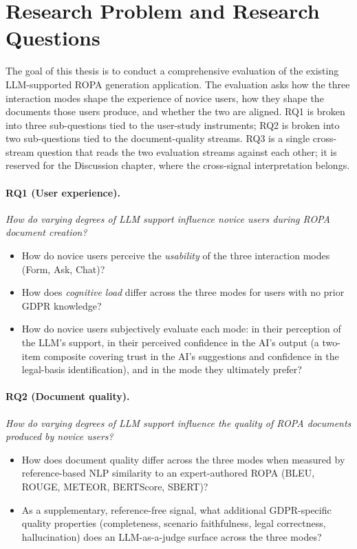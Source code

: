  
\section{Research Problem and Research Questions}
The goal of this thesis is to conduct a comprehensive evaluation of the existing LLM-supported ROPA generation application. The evaluation asks how the three interaction modes shape the experience of novice users, how they shape the documents those users produce, and whether the two are aligned. RQ1 is broken into three sub-questions tied to the user-study instruments; RQ2 is broken into two sub-questions tied to the document-quality streams. RQ3 is a single cross-stream question that reads the two evaluation streams against each other; it is reserved for the Discussion chapter, where the cross-signal interpretation belongs.

\paragraph{RQ1 (User experience).} \emph{How do varying degrees of LLM support influence novice users during ROPA document creation?}
\begin{itemize}
    \item[\textbf{RQ1.1}] How do novice users perceive the \emph{usability} of the three interaction modes (Form, Ask, Chat)?
    \item[\textbf{RQ1.2}] How does \emph{cognitive load} differ across the three modes for users with no prior GDPR knowledge?
    \item[\textbf{RQ1.3}] How do novice users subjectively evaluate each mode: in their perception of the LLM's support, in their perceived confidence in the AI's output (a two-item composite covering trust in the AI's suggestions and confidence in the legal-basis identification), and in the mode they ultimately prefer?
\end{itemize}



\paragraph{RQ2 (Document quality).} \emph{How do varying degrees of LLM support influence the quality of ROPA documents produced by novice users?}
\begin{itemize}
    \item[\textbf{RQ2.1}] How does document quality differ across the three modes when measured by reference-based NLP similarity to an expert-authored ROPA (BLEU, ROUGE, METEOR, BERTScore, SBERT)?
    \item[\textbf{RQ2.2}] As a supplementary, reference-free signal, what additional GDPR-specific quality properties (completeness, scenario faithfulness, legal correctness, hallucination) does an LLM-as-a-judge surface across the three modes?
\end{itemize}
